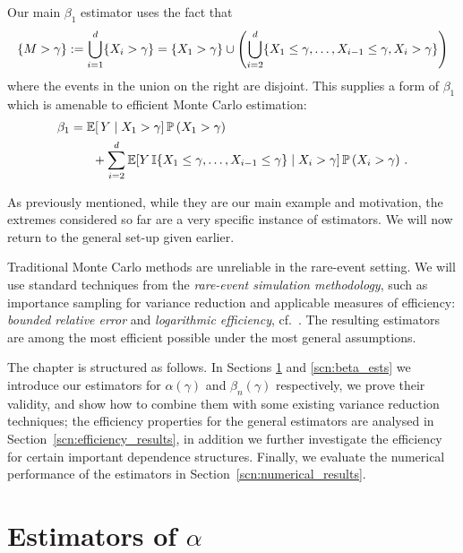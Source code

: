 Our main $\beta_1$ estimator uses the fact that
\begin{align} \label{extreme-first-partition}
\{M > \gamma\}  := \bigcup_{i=1}^d \{X_i > \gamma\} = \{X_1 > \gamma\} \cup \left( \bigcup_{i=2}^d \{X_1 \le \gamma, \dots, X_{i-1} \le \gamma, X_i > \gamma\} \right)
\end{align}
where the events in the union on the right are disjoint.
This supplies a form of $\beta_1$ which is amenable to efficient Monte Carlo estimation:
\begin{equation}  \label{extreme-beta_1}
\begin{aligned}
 \beta_1
 &= \operatorname{{\mathbb E}}[\, Y  \mid X_1 > \gamma ] \operatorname{{\mathbb P}}\left(X_1 > \gamma \right) \\
 &\hphantom{= } \quad + \sum_{i=2}^d \operatorname{{\mathbb E}} [ Y \, \mathbb{I}\{ X_1 \le \gamma, \dots, X_{i-1} \le \gamma  \} \mid X_i > \gamma ] \operatorname{{\mathbb P}}\left(X_i > \gamma \right) \,.
\end{aligned}
\end{equation}

As previously mentioned, while they are our main example and motivation, the extremes considered so far are a very specific instance of estimators. We will now return to the general set-up given earlier.

Traditional Monte Carlo methods are unreliable in the rare-event setting. We will use standard techniques from the \emph{rare-event simulation methodology}, such as importance sampling for variance reduction and applicable
measures of efficiency: \emph{bounded relative error} and \emph{logarithmic efficiency}, cf.\ \cite{asmussen2007stochastic,glasserman2003monte,rubinstein2011simulation}. The resulting estimators are among the most efficient possible under the
most general assumptions.

The chapter is structured as follows. In Sections \ref{scn:alpha_ests} and \ref{scn:beta_ests} we introduce our estimators for $\alpha(\gamma)$ and $\beta_n(\gamma)$ respectively,
we prove their validity, and
show how to combine them with some existing variance reduction techniques; the efficiency properties
for the general estimators are analysed in Section~\ref{scn:efficiency_results}, in addition we further investigate
the efficiency for certain important dependence structures. Finally, we evaluate the numerical performance of the
estimators in Section~\ref{scn:numerical_results}.

\section{Estimators of $\alpha$} \label{scn:alpha_ests}

